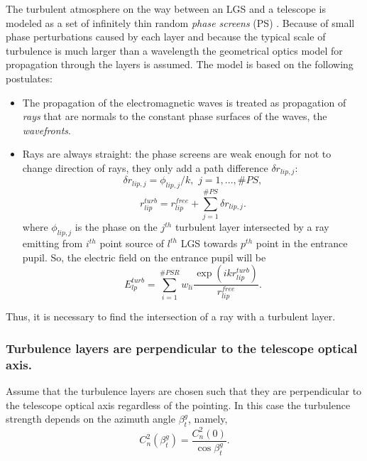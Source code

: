 The turbulent atmosphere on the way between an LGS and a telescope is modeled
as a set of infinitely thin random \emph{phase screens} (PS)
. Because of small phase perturbations caused by each
layer and because the typical scale of turbulence is much larger than a
wavelength the geometrical optics model for propagation through the layers is
assumed. The model is based on the following postulates:
\begin{itemize}
	\item The propagation of the electromagnetic waves is treated as propagation
	of \emph{rays} that are normals to the constant phase surfaces of the waves,
	the \emph{wavefronts}.  
	\item Rays are always straight: the phase screens are weak enough for not
	to change direction of rays, they only add a path difference
	$\delta r_{lip,j}$:
	\begin{equation} \label{eq:path-diff}
		\delta r_{lip,j} = \phi_{lip,j}/k, \,\, j = 1,...,\#PS,
	\end{equation}
	$$ r_{lip}^{turb} = r_{lip}^{free} + \sum_{j=1}^{\#PS} \delta r_{lip,j}. $$
	where $\phi_{lip,j}$ is the phase on the $j^{th}$ turbulent layer
	intersected by a ray emitting from $i^{th}$ point source of $l^{th}$ LGS
	towards $p^{th}$ point in the entrance pupil. So, the electric field
	on the entrance pupil will be
	\begin{equation} \label{eq:spherical-superposition-turb}
		E^{turb}_{lp} =
		\sum_{i=1}^{\#PSR} w_{li}
		\frac{\exp(i k r_{lip}^{turb})}{r_{lip}^{free}}.
	\end{equation}
\end{itemize}

Thus, it is necessary to find the intersection of a ray with a turbulent layer.

\subsubsection{Turbulence layers are perpendicular to the telescope optical
axis.}

Assume that the turbulence layers are chosen such that they are perpendicular
to the telescope optical axis regardless of the pointing.
In this case the turbulence strength depends on the azimuth angle
$\beta_{t}^{g}$, namely,
\begin{equation} \label{eq:turb-vs-beta}
	C_{n}^{2} (\beta_{t}^{g}) = \frac{C_{n}^{2}(0)} {\cos \beta_{t}^{g}}.
\end{equation}


